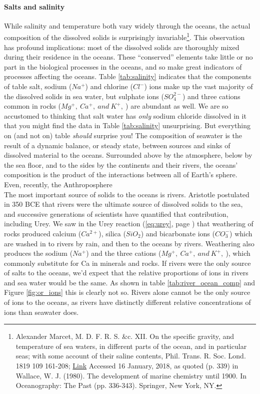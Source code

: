 \documentclass[amstex,12pt]{book}
\begin{document}
\paragraph{Salts and salinity}
While salinity and temperature both vary widely through the oceans, the actual composition of the dissolved solids is surprisingly invariable\footnote{Alexander Marcet, M. D. F. R. S. \&c. XII. On the specific gravity, and temperature of sea waters, in different parts of the ocean, and in particular seas; with some account of their saline contents, Phil. Trans. R. Soc. Lond. 1819 109 161-208; \href{doi:10.1098/rstl.1819.0014 2053-9223}{Link} Accessed 16 January, 2018, as quoted (p. 339) in Wallace, W. J. (1980). The development of marine chemistry until 1900. In Oceanography: The Past (pp. 336-343). Springer, New York, NY.}. This observation has profound implications: most of the dissolved solids are thoroughly mixed during their residence in the oceans. These ``conserved'' elements take little or no part in the biological processes in the oceans, and so make great indicators of processes affecting the oceans. Table \ref{tab:salinity} indicates that the components of table salt, sodium ($Na^+$) and chlorine ($Cl^-$) ions make up the vast majority of the dissolved solids in sea water, but sulphate ions ($SO_4^{2-}$) and three cations common in rocks ($Mg^+,\ Ca^+,\ and\ K^+,\ $) are abundant as well. We are so accustomed to thinking that salt water has \emph{only} sodium chloride dissolved in it that you might find the data in Table \ref{tab:salinity} unsurprising. But everything on (and not on) table \emph{should} surprise you! The composition of seawater is the result of a dynamic balance, or steady state, between sources and sinks of dissolved material to the oceans. Surrounded above by the atmosphere, below by the sea floor, and to the sides by the continents and their rivers, the oceans' composition is the product of the interactions between all of Earth's sphere. Even, recently, the Anthroposphere\\

The most important source of solids to the oceans is rivers. Aristotle postulated in 350 BCE that rivers were the ultimate source of dissolved solids to the sea, and successive generations of scientists have quantified that contribution, including Urey. We saw in the Urey reaction (\ref{eq:urey}, page \pageref{eq:urey}) that weathering of rocks produced calcium ($Ca^{2+}$), silica ($SiO_2$) and bicarbonate ions ($CO_3^-$) which are washed in to rivers by rain, and then to the oceans by rivers. Weathering also produces the sodium ($Na^+$) and the three cations ($Mg^+,\ Ca^+,\ and\ K^+,\ $), which commonly substitute for Ca in minerals and rocks. If rivers were the only source of salts to the oceans, we'd expect that the relative proportions of ions in rivers and sea water would be the same. As shown in table \ref{tab:river_ocean_comp} and Figure \ref{fig:or_ions} this is clearly not so. Rivers alone cannot be the only source of ions to the oceans, as rivers have distinctly different relative concentrations of ions than seawater does.\\
\end{document}
